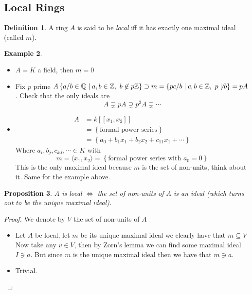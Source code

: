 \documentclass[11pt,a4paper]{article}
\theoremstyle{definition}
\newtheorem{definition}{Definition}[section]
\newtheorem{example}[definition]{Example}
\theoremstyle{plain}
\newtheorem{proposition}[definition]{Proposition}
\theoremstyle{remark}
\newcommand{\Z}{\mathbb{Z}}
\newcommand{\Q}{\mathbb{Q}}
\renewcommand{\set}[1]{\left\{ #1 \right\}}
\newcommand{\angles}[1]{\langle #1 \rangle}
\begin{document}
\subsection{Local Rings}
\begin{definition}
    A ring $A$ is said to be \emph{local} iff it has exactly one maximal ideal (called $m$).
\end{definition} 

\begin{example}
    \begin{itemize}
        \item $A = K$ a field, then $m = 0$ 
        \item Fix $p$ prime $A \set{a/b \in \Q \mid a, b \in \Z, \ b \not\in p \Z} \supset m = \set{pc / b \mid c,b \in \Z, \ p \not\mid b} = p A$. 
        Check that the only ideals are 
        $$A \supsetneq pA \supsetneq p^2 A \supsetneq \cdots$$
        \item \begin{align*}
            A &= k [[x_1,x_2]] \\
            &= \set{\text{formal power series}} \\
            &= \set{a_0 + b_1 x_1 + b_2 x_2 + c_{11} x_1 + \cdots} 
        \end{align*}
        Where $a_i, b_j, c_{k.l}, \cdots \in K$ with 
        $$m = \angles{x_1, x_2} = \set{\text{formal power series with } a_0 = 0}$$
        This is the only maximal ideal because $m$ is the set of non-units, think about it. 
        Same for the example above.
    \end{itemize}
\end{example}

\begin{proposition}
    $A$ is local $\iff$ the set of non-units of $A$ is an ideal (which turns out to be the unique maximal ideal).
\end{proposition}

\begin{proof}
    We denote by $V$ the set of non-units of $A$
    \begin{itemize}
        \item[$\implies$] Let $A$ be local, let $m$ be its unique maximal ideal we clearly have that $m \subseteq V$
        Now take any $v \in V$, then by Zorn's lemma we can find some maximal ideal $I \ni a$. But since $m$ is the unique maximal ideal then we have 
        that $m \ni a$. 

        \item[$\impliedby$] Trivial.
    \end{itemize}
\end{proof}
\end{document}
